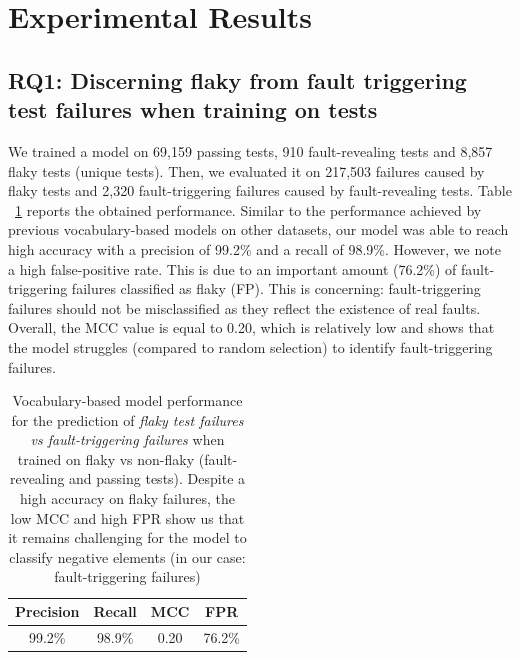 \section{Experimental Results}
\label{sec:chromium-results}



\subsection{RQ1: Discerning flaky from fault triggering test failures when training on tests}

We trained a model on 69,159 passing tests, 910 fault-revealing tests and 8,857 flaky tests (unique tests).
Then, we evaluated it on 217,503 failures caused by flaky tests and 2,320 fault-triggering failures caused by fault-revealing tests. Table ~\ref{table:rq1} reports the obtained performance. Similar to the performance achieved by previous vocabulary-based models on other datasets, our model was able to reach high accuracy with a precision of 99.2\% and a recall of 98.9\%. However, we note a high false-positive rate. This is due to an important amount (76.2\%) of fault-triggering failures classified as flaky (FP). This is concerning: fault-triggering failures should not be misclassified as they reflect the existence of real faults. Overall, the MCC value is equal to 0.20, which is relatively low and shows that the model struggles (compared to random selection) to identify fault-triggering failures. 

\begin{table}[ht]
\caption{Vocabulary-based model performance for the prediction of \textit{flaky test failures vs fault-triggering failures} when trained on flaky vs non-flaky (fault-revealing and passing tests). Despite a high accuracy on flaky failures, the low MCC and high FPR show us that it remains challenging for the model to classify negative elements (in our case: fault-triggering failures)}
\vspace{-1.0em}
\label{table:rq1}
\centering
\begin{tabular}{c|c|c|c} 
 \toprule
 \textbf{Precision} & \textbf{Recall} & \textbf{MCC} & \textbf{FPR} \\ [0.5ex] 
 \midrule
 99.2\% & 98.9\% & 0.20 & 76.2\% \\ 
 \bottomrule
\end{tabular}
\end{table}


